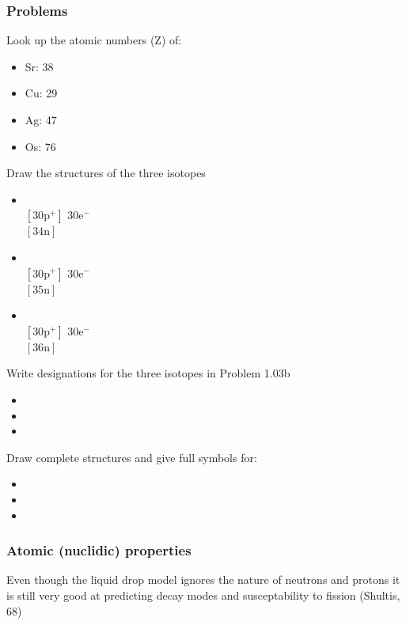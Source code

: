 \documentclass{article}
\begin{document}
\subsubsection{Problems}
Look up the atomic numbers (Z) of:
\begin{itemize}
    \item Sr: 38
    \item Cu: 29
    \item Ag: 47
    \item Os: 76
\end{itemize}
Draw the structures of the three isotopes
\begin{itemize}
    \item {} \\
$\left[30 \mathrm{p}^+ \right]$  $30 \mathrm{e}^-$ \\
$\left[34 \mathrm{n} \right]$ 
    \item {} \\
$\left[30 \mathrm{p}^+ \right]$  $30 \mathrm{e}^-$ \\
$\left[35 \mathrm{n} \right]$ 
    \item {} \\
$\left[30 \mathrm{p}^+ \right]$  $30 \mathrm{e}^-$ \\
$\left[36 \mathrm{n} \right]$ 
\end{itemize}
Write designations for the three isotopes in Problem 1.03b
\begin{itemize}
    \item{}
    \item{}
    \item{}
\end{itemize}
Draw complete structures and give full symbols for:
\begin{itemize}
    \item {} \vspace{10mm}
    \item {} \vspace{10mm}
    \item {} \vspace{10mm}
\end{itemize}

\subsubsection{Atomic (nuclidic) properties}
Even though the liquid drop model ignores the nature of neutrons and protons it is still very good at predicting decay modes and susceptability to fission (Shultis, 68)
\end{document}
